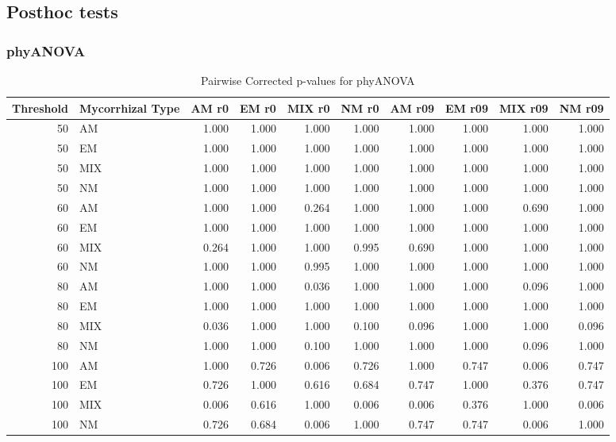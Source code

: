 \documentclass[]{article}
\begin{document}
\hypertarget{posthoc-tests-2}{%
\subsection{Posthoc tests}\label{posthoc-tests-2}}

\hypertarget{phyanova-5}{%
\subsubsection{phyANOVA}\label{phyanova-5}}

\begin{table}[H]

\caption{\label{tab:unnamed-chunk-31}Pairwise Corrected p-values for phyANOVA}
\centering
\begin{tabular}{r|l|r|r|r|r|r|r|r|r}
\hline
Threshold & Mycorrhizal Type & AM r0 & EM r0 & MIX r0 & NM r0 & AM r09 & EM r09 & MIX r09 & NM r09\\
\hline
50 & AM & 1.000 & 1.000 & 1.000 & 1.000 & 1.000 & 1.000 & 1.000 & 1.000\\
\hline
50 & EM & 1.000 & 1.000 & 1.000 & 1.000 & 1.000 & 1.000 & 1.000 & 1.000\\
\hline
50 & MIX & 1.000 & 1.000 & 1.000 & 1.000 & 1.000 & 1.000 & 1.000 & 1.000\\
\hline
50 & NM & 1.000 & 1.000 & 1.000 & 1.000 & 1.000 & 1.000 & 1.000 & 1.000\\
\hline
60 & AM & 1.000 & 1.000 & 0.264 & 1.000 & 1.000 & 1.000 & 0.690 & 1.000\\
\hline
60 & EM & 1.000 & 1.000 & 1.000 & 1.000 & 1.000 & 1.000 & 1.000 & 1.000\\
\hline
60 & MIX & 0.264 & 1.000 & 1.000 & 0.995 & 0.690 & 1.000 & 1.000 & 1.000\\
\hline
60 & NM & 1.000 & 1.000 & 0.995 & 1.000 & 1.000 & 1.000 & 1.000 & 1.000\\
\hline
80 & AM & 1.000 & 1.000 & 0.036 & 1.000 & 1.000 & 1.000 & 0.096 & 1.000\\
\hline
80 & EM & 1.000 & 1.000 & 1.000 & 1.000 & 1.000 & 1.000 & 1.000 & 1.000\\
\hline
80 & MIX & 0.036 & 1.000 & 1.000 & 0.100 & 0.096 & 1.000 & 1.000 & 0.096\\
\hline
80 & NM & 1.000 & 1.000 & 0.100 & 1.000 & 1.000 & 1.000 & 0.096 & 1.000\\
\hline
100 & AM & 1.000 & 0.726 & 0.006 & 0.726 & 1.000 & 0.747 & 0.006 & 0.747\\
\hline
100 & EM & 0.726 & 1.000 & 0.616 & 0.684 & 0.747 & 1.000 & 0.376 & 0.747\\
\hline
100 & MIX & 0.006 & 0.616 & 1.000 & 0.006 & 0.006 & 0.376 & 1.000 & 0.006\\
\hline
100 & NM & 0.726 & 0.684 & 0.006 & 1.000 & 0.747 & 0.747 & 0.006 & 1.000\\
\hline
\end{tabular}
\end{table}
\end{document}
